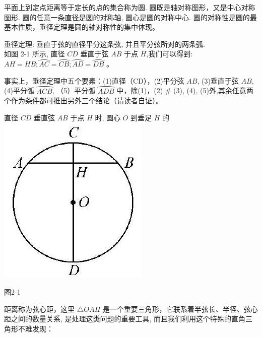 \documentclass[10pt]{article}
\begin{document}
平面上到定点距离等于定长的点的集合称为圆. 圆既是轴对称图形，又是中心对称图形. 圆的任意一条直径是圆的对称轴, 圆心是圆的对称中心. 圆的对称性是圆的最基本性质，垂径定理是圆的轴对称性的集中体现。

垂径定理: 垂直于弦的直径平分这条弦, 并且平分弦所对的两条弧.\\
如图 2-1 所示, 直径 $C D$ 垂直于弦 $A B$ 于点 $H$,我们可以得到: $A H=H B ; \overparen{A C}=\overparen{C B} ; \overparen{A D}=\overparen{D B}$ 。

事实上，垂径定理中五个要素：(1)直径（CD），(2)平分弦 $A B$, (3)垂直于弦 $A B$, (4)平分弧 $\overparen{A C B}$, （5）平分弧 $\overparen{A D B}$ 中，除(1)，(2) \# (3), (4), (5)外,其余任意两个作为条件都可推出另外三个结论（请读者自证）。

直径 $C D$ 垂直弦 $A B$ 于点 $H$ 时, 圆心 $O$ 到垂足 $H$ 的\\
\includegraphics[max width=\textwidth, center]{2024_10_30_66b8e5e701da2093c133g-017(2)}

图2-1

距离称为弦心距，这里 $\triangle O A H$ 是一个重要三角形，它联系着半弦长、半径、弦心距之间的数量关系, 是处理这类问题的重要工具, 而且我们利用这个特殊的直角三角形不难发现：
\end{document}
